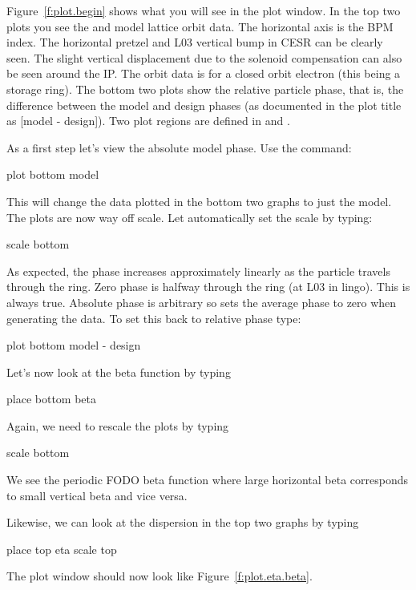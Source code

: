 Figure~\ref{f:plot.begin} shows what you will see in the plot
window. In the top two plots you see the  and  model
lattice orbit data. The horizontal axis is the \cesr BPM index. The
horizontal pretzel and L03 vertical bump in CESR can be clearly
seen. The slight vertical displacement due to the solenoid
compensation can also be seen around the IP. The orbit data is for a
closed orbit electron (this being a storage ring). The bottom two
plots show the relative particle phase, that is, the difference
between the model and design phases (as documented in the plot title
as [model - design]). Two plot regions are defined in \tao
{} and .

As a first step let's view the absolute model phase. Use the command:
\begin{example}
  plot bottom model
\end{example}
This will change the data plotted in the bottom two graphs to just the
model.  The plots are now way off scale. Let \tao automatically set
the scale by typing:
\begin{example}
  scale bottom
\end{example}
As expected, the phase increases approximately linearly as the
particle travels through the ring. Zero phase is halfway through the
ring (at L03 in \cesr lingo).  This is always true. Absolute phase is
arbitrary so \tao sets the average phase to zero when generating the
data. To set this back to relative phase type:
\begin{example}
  plot bottom model - design
\end{example}

Let's now look at the beta function by typing
\begin{example}
  place bottom beta
\end{example}
Again, we need to rescale the plots by typing
\begin{example}
  scale bottom
\end{example}
We see the periodic FODO beta function where large horizontal beta
corresponds to small vertical beta and vice versa.

Likewise, we can look at the dispersion in the top two graphs by
typing
\begin{example}
  place top eta
  scale top
\end{example}
The plot window should now look like Figure~\ref{f:plot.eta.beta}.


